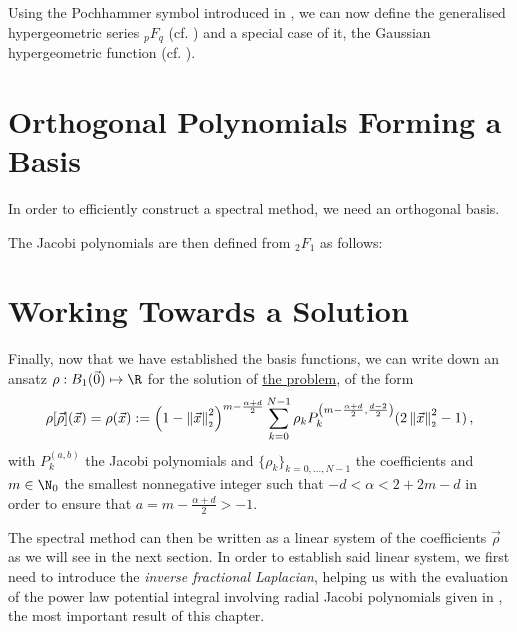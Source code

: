 Using the Pochhammer symbol introduced in , we can now define the generalised hypergeometric series ${}_pF_q$ (cf. ) and a special case of it, the Gaussian hypergeometric function (cf. ).



\pagebreak
\section{Orthogonal Polynomials Forming a Basis}
In order to efficiently construct a spectral method, we need an orthogonal basis.



The Jacobi polynomials are then defined from ${}_2F_1$ as follows:

% 
% 


\section{Working Towards a Solution}
Finally, now that we have established the basis functions, we can write down an ansatz $\rho: B_1(\vec{0}) \mapsto \R$ for the solution of \hyperref[def:the-problem]{the problem}, of the form
\begin{equation}
  \rho[\vec{\rho}](\vec{x}) = \rho(\vec{x}) := \left(1-\left\lVert\vec{x}\right\rVert_{\scriptscriptstyle 2}^{2}\right)^{m - \frac{\alpha + d}{2}} \sum_{k=0}^{N-1} \rho_k P_{k}^{\left(m - \frac{\alpha + d}{2},\frac{d-2}{2}\right)}(2 \left\lVert\vec{x}\right\rVert_{\scriptscriptstyle 2}^{2}-1)\,,
  \label{eq:ansatz}
\end{equation}
with $P_k^{(a, b)}$ the Jacobi polynomials and $\{\rho_k\}_{k=0, ..., N-1}$ the coefficients and $m \in \N_0$ the smallest nonnegative integer such that $-d < \alpha < 2 +  2m - d$ in order to ensure that $a = m - \frac{\alpha+d}{2} > -1$.

The spectral method can then be written as a linear system of the coefficients $\vec{\rho}$ as we will see in the next section.
In order to establish said linear system, we first need to introduce the \textit{inverse fractional Laplacian}, helping us with the evaluation of the power law potential integral involving radial Jacobi polynomials given in , the most important result of this chapter.

